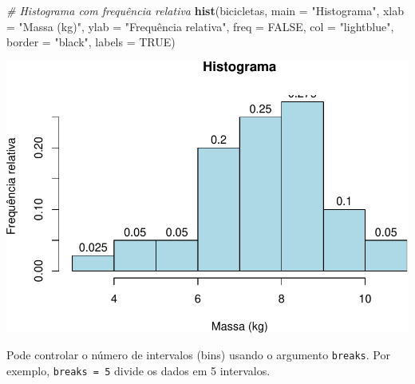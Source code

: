 \documentclass[
]{book}
\newenvironment{Shaded}{\begin{snugshade}}{\end{snugshade}}
\newcommand{\AttributeTok}[1]{\textcolor[rgb]{0.13,0.29,0.53}{#1}}
\newcommand{\CommentTok}[1]{\textcolor[rgb]{0.56,0.35,0.01}{\textit{#1}}}
\newcommand{\ConstantTok}[1]{\textcolor[rgb]{0.56,0.35,0.01}{#1}}
\newcommand{\DocumentationTok}[1]{\textcolor[rgb]{0.56,0.35,0.01}{\textbf{\textit{#1}}}}
\newcommand{\FunctionTok}[1]{\textcolor[rgb]{0.13,0.29,0.53}{\textbf{#1}}}
\newcommand{\NormalTok}[1]{#1}
\newcommand{\SpecialCharTok}[1]{\textcolor[rgb]{0.81,0.36,0.00}{\textbf{#1}}}
\newcommand{\StringTok}[1]{\textcolor[rgb]{0.31,0.60,0.02}{#1}}
\begin{document}
\begin{Shaded}
\end{Shaded}

\begin{Shaded}
\begin{Highlighting}[]
\CommentTok{\# Histograma com frequência relativa}
\FunctionTok{hist}\NormalTok{(bicicletas,}
  \AttributeTok{main =} \StringTok{"Histograma"}\NormalTok{,          }
  \AttributeTok{xlab =} \StringTok{"Massa (kg)"}\NormalTok{,          }
  \AttributeTok{ylab =} \StringTok{"Frequência relativa"}\NormalTok{,     }
  \AttributeTok{freq =} \ConstantTok{FALSE}\NormalTok{,}
  \AttributeTok{col =} \StringTok{"lightblue"}\NormalTok{,}
  \AttributeTok{border =} \StringTok{"black"}\NormalTok{,}
  \AttributeTok{labels =} \ConstantTok{TRUE}\NormalTok{)}
\end{Highlighting}
\end{Shaded}

\includegraphics{introR_files/figure-latex/unnamed-chunk-172-1.pdf}

Pode controlar o número de intervalos (bins) usando o argumento
\texttt{breaks}. Por exemplo, \texttt{breaks\ =\ 5} divide os dados em 5 intervalos.
\end{document}
